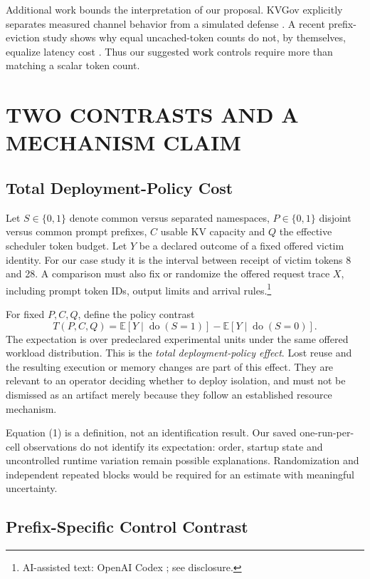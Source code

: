 \documentclass[a4paper,twoside]{article}
\newcommand{\aicite}{\footnote{AI-assisted text: OpenAI Codex \cite{codex}; see disclosure.}}
\begin{document}
Additional work bounds the interpretation of our proposal. KVGov explicitly separates measured channel behavior from a simulated defense \cite{kvgov}. A recent prefix-eviction study shows why equal uncached-token counts do not, by themselves, equalize latency cost \cite{eviction}. Thus our suggested work controls require more than matching a scalar token count.

\section{\uppercase{Two Contrasts and a Mechanism Claim}}

\subsection{Total Deployment-Policy Cost}

Let $S\in\{0,1\}$ denote common versus separated namespaces, $P\in\{0,1\}$ disjoint versus common prompt prefixes, $C$ usable KV capacity and $Q$ the effective scheduler token budget. Let $Y$ be a declared outcome of a fixed offered victim identity. For our case study it is the interval between receipt of victim tokens 8 and 28. A comparison must also fix or randomize the offered request trace $X$, including prompt token IDs, output limits and arrival rules.\aicite

For fixed $P,C,Q$, define the policy contrast
\begin{equation}
 T(P,C,Q)=\mathbb{E}[Y\mid\operatorname{do}(S=1)]
             -\mathbb{E}[Y\mid\operatorname{do}(S=0)].
\end{equation}
The expectation is over predeclared experimental units under the same offered workload distribution. This is the \emph{total deployment-policy effect}. Lost reuse and the resulting execution or memory changes are part of this effect. They are relevant to an operator deciding whether to deploy isolation, and must not be dismissed as an artifact merely because they follow an established resource mechanism.

Equation (1) is a definition, not an identification result. Our saved one-run-per-cell observations do not identify its expectation: order, startup state and uncontrolled runtime variation remain possible explanations. Randomization and independent repeated blocks would be required for an estimate with meaningful uncertainty.

\subsection{Prefix-Specific Control Contrast}
\end{document}
